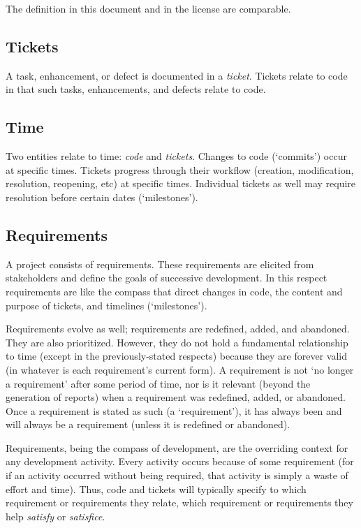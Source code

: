 \documentclass{article}
\begin{document}
The definition in this document and in the license are comparable.

\subsection{Tickets}

A task, enhancement, or defect is documented in a \textit{ticket}. Tickets
relate to code in that such tasks, enhancements, and defects relate to code. 

\subsection{Time}

Two entities relate to time: \textit{code} and \textit{tickets}. Changes to code
(`commits') occur at specific times. Tickets progress through their workflow
(creation, modification, resolution, reopening, etc) at specific times.
Individual tickets as well may require resolution before certain dates (`milestones').

\subsection{Requirements}

A project consists of requirements. These requirements are elicited from
stakeholders and define the goals of successive development. In this respect
requirements are like the compass that direct changes in code, the content and
purpose of tickets, and timelines (`milestones').

Requirements evolve as well; requirements are redefined, added, and abandoned.
They are also prioritized. However, they do not hold a fundamental relationship
to time (except in the previously-stated respects) because they are forever
valid (in whatever is each requirement's current form). A requirement is not
`no longer a requirement' after some period of time, nor is it relevant (beyond
the generation of reports) when a requirement was redefined, added, or abandoned.
Once a requirement is stated as such (a `requirement'), it has always been and
will always be a requirement (unless it is redefined or abandoned).

Requirements, being the compass of development, are the overriding context for
any development activity. Every activity occurs because of some requirement (for
if an activity occurred without being required, that activity is simply a waste
of effort and time). Thus, code and tickets will typically specify to which
requirement or requirements they relate, which requirement or requirements they
help \textit{satisfy} or \textit{satisfice}.
\end{document}
